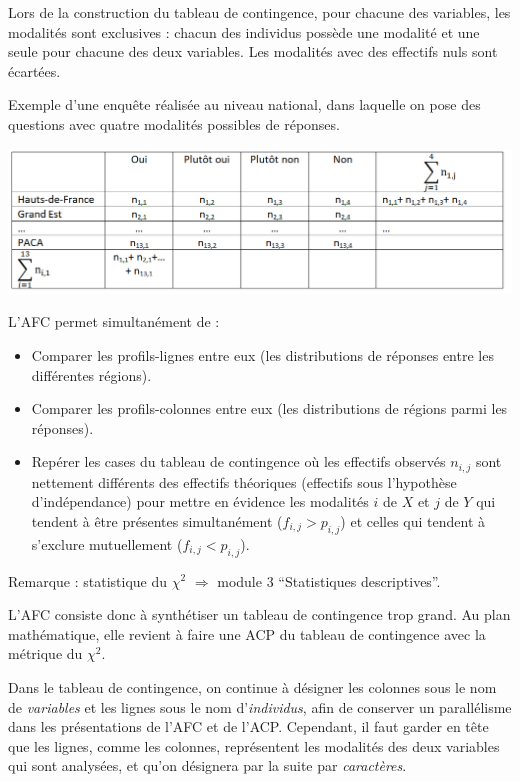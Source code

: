 \documentclass[]{book}
\providecommand{\tightlist}{%
  \setlength{\itemsep}{0pt}\setlength{\parskip}{0pt}}
\begin{document}
Lors de la construction du tableau de contingence, pour chacune des variables, les modalités sont exclusives : chacun des individus possède une modalité et une seule pour chacune des deux variables. Les modalités avec des effectifs nuls sont écartées.

Exemple d'une enquête réalisée au niveau national, dans laquelle on pose des questions avec quatre modalités possibles de réponses.

\includegraphics{images/tableau_contingence.png}

L'AFC permet simultanément de :

\begin{itemize}
\tightlist
\item
  Comparer les profils-lignes entre eux (les distributions de réponses entre les différentes régions).\\
\item
  Comparer les profils-colonnes entre eux (les distributions de régions parmi les réponses).\\
\item
  Repérer les cases du tableau de contingence où les effectifs observés \(n_{i,j}\) sont nettement différents des effectifs théoriques (effectifs sous l'hypothèse d'indépendance) pour mettre en évidence les modalités \(i\) de \(X\) et \(j\) de \(Y\) qui tendent à être présentes simultanément (\(f_{i,j} > p_{i,j}\)) et celles qui tendent à s'exclure mutuellement (\(f_{i,j} < p_{i,j}\)).
\end{itemize}

Remarque : statistique du \(\chi^2\) \(\Rightarrow\) module 3 ``Statistiques descriptives''.

L'AFC consiste donc à synthétiser un tableau de contingence trop grand. Au plan mathématique, elle revient à faire une ACP du tableau de contingence avec la métrique du \(\chi^2\).

Dans le tableau de contingence, on continue à désigner les colonnes sous le nom de \emph{variables} et les lignes sous le nom d'\emph{individus}, afin de conserver un parallélisme dans les présentations de l'AFC et de l'ACP. Cependant, il faut garder en tête que les lignes, comme les colonnes, représentent les modalités des deux variables qui sont analysées, et qu'on désignera par la suite par \emph{caractères}.
\end{document}
